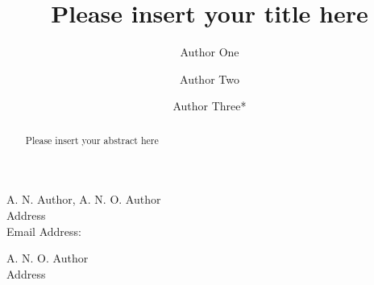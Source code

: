 \documentclass{WileyMSP-template}
\begin{document}
\pagestyle{fancy}


\title{Please insert your title here}

\maketitle




\author{Author One}
\author{Author Two}
\author{Author Three*}




\dedication{Optional dedication here. If no dedication is required, please leave blank}






\begin{affiliations}
A. N. Author, A. N. O. Author\\
Address\\
Email Address:

A. N. O. Author\\
Address

\end{affiliations}






\begin{abstract}

Please insert your abstract here

\end{abstract}

\end{document}
